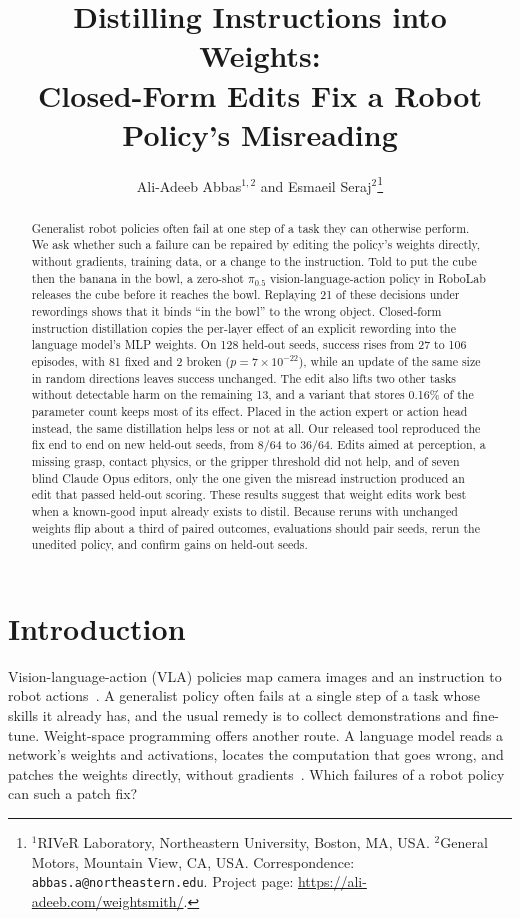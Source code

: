 \documentclass{article}
\title{Distilling Instructions into Weights:\\Closed-Form Edits Fix a Robot Policy's Misreading}
\author{Ali-Adeeb Abbas$^{1,2}$ and Esmaeil Seraj$^{2}$\thanks{$^1$RIVeR Laboratory, Northeastern University, Boston, MA, USA. $^2$General Motors, Mountain View, CA, USA. Correspondence: \texttt{abbas.a@northeastern.edu}. Project page: \url{https://ali-adeeb.com/weightsmith/}.}}
\newcommand{\pifive}{$\pi_{0.5}$}
\begin{document}
\maketitle
\begin{abstract}
Generalist robot policies often fail at one step of a task they can otherwise perform. We ask whether such a failure can be repaired by editing the policy's weights directly, without gradients, training data, or a change to the instruction. Told to put the cube then the banana in the bowl, a zero-shot \pifive{} vision-language-action policy in RoboLab releases the cube before it reaches the bowl. Replaying 21 of these decisions under rewordings shows that it binds ``in the bowl'' to the wrong object. Closed-form instruction distillation copies the per-layer effect of an explicit rewording into the language model's MLP weights. On 128 held-out seeds, success rises from 27 to 106 episodes, with 81 fixed and 2 broken ($p=7\times10^{-22}$), while an update of the same size in random directions leaves success unchanged. The edit also lifts two other tasks without detectable harm on the remaining 13, and a variant that stores 0.16\% of the parameter count keeps most of its effect. Placed in the action expert or action head instead, the same distillation helps less or not at all. Our released tool reproduced the fix end to end on new held-out seeds, from 8/64 to 36/64. Edits aimed at perception, a missing grasp, contact physics, or the gripper threshold did not help, and of seven blind Claude Opus editors, only the one given the misread instruction produced an edit that passed held-out scoring. These results suggest that weight edits work best when a known-good input already exists to distil. Because reruns with unchanged weights flip about a third of paired outcomes, evaluations should pair seeds, rerun the unedited policy, and confirm gains on held-out seeds.
\end{abstract}

\setlength{\parskip}{2.5pt}
\setlength{\intextsep}{8pt plus 2pt minus 2pt}
\setlength{\textfloatsep}{12pt plus 2pt minus 2pt}
\section{Introduction}
Vision-language-action (VLA) policies map camera images and an instruction to robot actions~\citep{pi2025pi05}. A generalist policy often fails at a single step of a task whose skills it already has, and the usual remedy is to collect demonstrations and fine-tune. Weight-space programming offers another route. A language model reads a network's weights and activations, locates the computation that goes wrong, and patches the weights directly, without gradients~\citep{takehi2026sparks}. Which failures of a robot policy can such a patch fix?
\end{document}
